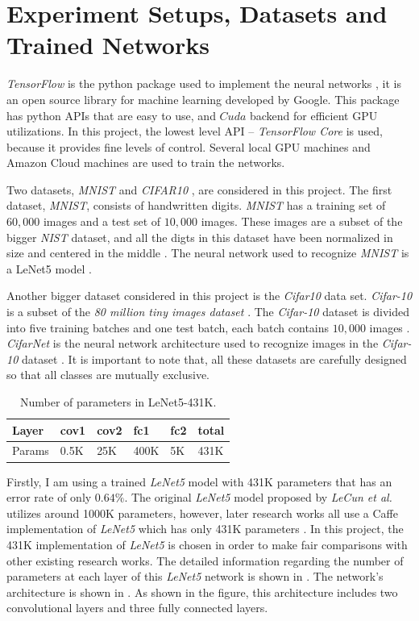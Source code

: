 \documentclass[a4paper,12pt]{report}
\begin{document}
\chapter{Experiment Setups, Datasets and Trained Networks}
\textit{TensorFlow} is the python package used to implement the neural networks
\cite{tensorflow}, it is an open source library for machine learning developed
by Google.
This package has python APIs that are easy to use, and $Cuda$ backend for
efficient GPU utilizations.
In this project, the lowest level API -- \textit{TensorFlow Core} is used, because it
provides fine levels of control.
Several local GPU machines and Amazon Cloud machines are used to train the networks.

Two datasets, \textit{MNIST} \cite{lecun1998mnist} and \textit{CIFAR10} \cite{krizhevsky2014cifar},
are considered in this project.
The first dataset, \textit{MNIST}, consists of handwritten digits.
\textit{MNIST} has a training set of $60,000$ images and a test set of $10,000$
images.
These images are a subset of the bigger \textit{NIST} dataset, and all the digts
in this dataset have been normalized in size and centered in the middle \cite{lecun1998mnist}.
The neural network used to recognize \textit{MNIST} is a LeNet5 model \cite{lecun2015lenet}.

Another bigger dataset considered in this project is the \textit{Cifar10} data
set.
\textit{Cifar-10} is a subset of the \textit{80 million tiny images dataset} \cite{torralba200880}.
The \textit{Cifar-10} dataset is divided into five training batches and one test batch,
each batch contains $10,000$ images \cite{krizhevsky2014cifar}.
\textit{CifarNet} is the neural network architecture used to recognize images in the
\textit{Cifar-10} dataset \cite{krizhevsky2009learning}.
It is important to note that, all these datasets are carefully designed so that
all classes are mutually exclusive.
\begin{table}[!h]
\centering
\begin{tabular}{|l|l|l|l|l|l|}
\hline
Layer			&cov1	&cov2	&fc1	&fc2 		&total\\ \hline
Params		& 0.5K		&25K	&400K	&5K		&431K\\
\hline
\end{tabular}
\caption{Number of parameters in LeNet5-431K.}
\label{tab:LeNetparam}
\end{table}

Firstly, I am using a trained \textit{LeNet5} model with 431K parameters that
has an error rate of only $0.64\%$.
The original \textit{LeNet5} model proposed by \textit{LeCun et al.} utilizes around 1000K
parameters, however, later research works all use a Caffe implementation of \textit{LeNet5}
which has only 431K parameters \cite{jia2014caffe, Han15, Guo}.
In this project, the 431K implementation of \textit{LeNet5 }is chosen in order to make
fair comparisons with other existing research works.
The detailed information regarding the number of parameters
at each layer of this \textit{LeNet5} network is shown in .
The network's architecture is shown in .
As shown in the figure, this architecture includes two convolutional layers and three fully connected
layers.
\end{document}
